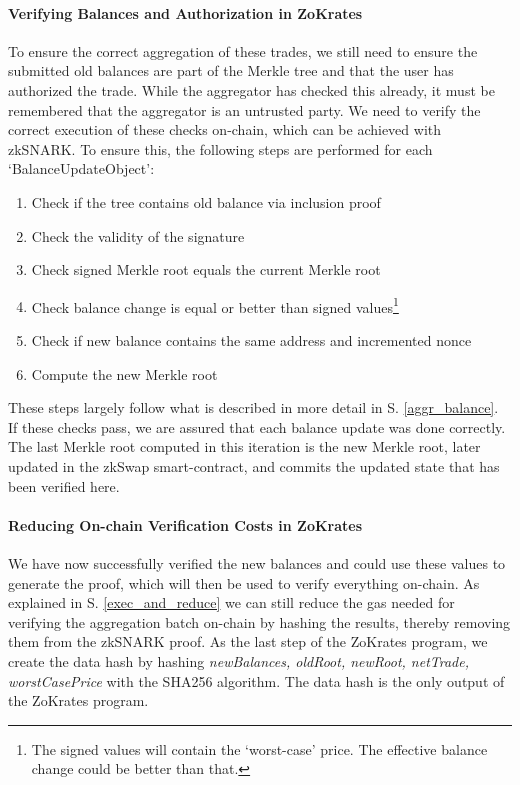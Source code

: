 \documentclass[../../thesis.tex]{subfiles}
\begin{document}
\paragraph{Verifying Balances and Authorization in ZoKrates}
To ensure the correct aggregation of these trades, we still need to ensure the submitted old balances are part of the Merkle tree and that the user has authorized the trade. While the aggregator has checked this already, it must be remembered that the aggregator is an untrusted party. We need to verify the correct execution of these checks on-chain, which can be achieved with zkSNARK. To ensure this, the following steps are performed for each `BalanceUpdateObject':

\begin{enumerate}
    \item Check if the tree contains old balance via inclusion proof
    \item Check the validity of the signature
    \item Check signed Merkle root equals the current Merkle root
    \item Check balance change is equal or better than signed values\footnote{The signed values will contain the `worst-case' price. The effective balance change could be better than that.}
    \item Check if new balance contains the same address and incremented nonce
    \item Compute the new Merkle root
\end{enumerate}

These steps largely follow what is described in more detail in S. \ref{aggr_balance}. If these checks pass, we are assured that each balance update was done correctly. The last Merkle root computed in this iteration is the new Merkle root, later updated in the zkSwap smart-contract, and commits the updated state that has been verified here.

\paragraph{Reducing On-chain Verification Costs in ZoKrates}
We have now successfully verified the new balances and could use these values to generate the proof, which will then be used to verify everything on-chain. As explained in S. \ref{exec_and_reduce} we can still reduce the gas needed for verifying the aggregation batch on-chain by hashing the results, thereby removing them from the zkSNARK proof. As the last step of the ZoKrates program, we create the data hash by hashing \textit{newBalances, oldRoot, newRoot, netTrade, worstCasePrice} with the SHA256 algorithm. The data hash is the only output of the ZoKrates program.
\end{document}
